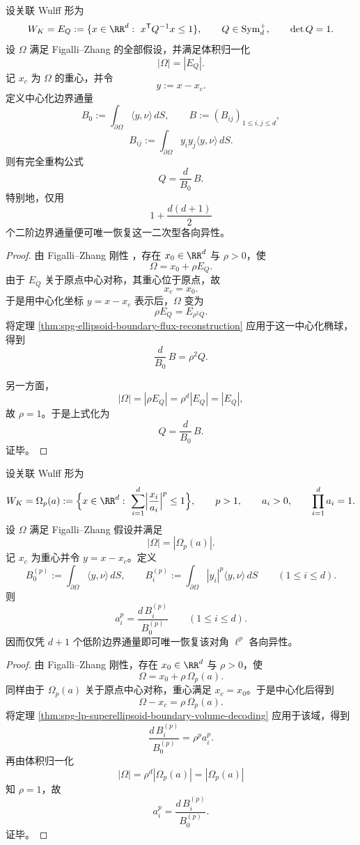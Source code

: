 \begin{theorem}\label{thm:conclusion-serrin-ellipsoid-flux-identifiability}
设关联 Wulff 形为
\[
W_K=E_Q:=\{x\in\RR^d:\ x^{\mathsf T}Q^{-1}x\le 1\},
\qquad
Q\in\mathrm{Sym}_d^+,
\qquad
\det Q=1.
\]
设 \(\Omega\) 满足 Figalli--Zhang 的全部假设，并满足体积归一化
\[
|\Omega|=|E_Q|.
\]
记 \(x_c\) 为 \(\Omega\) 的重心，并令
\[
y:=x-x_c.
\]
定义中心化边界通量
\[
B_0:=\int_{\partial\Omega}\langle y,\nu\rangle\,dS,
\qquad
B:=(B_{ij})_{1\le i,j\le d},
\]
\[
B_{ij}:=\int_{\partial\Omega}y_i y_j\langle y,\nu\rangle\,dS.
\]
则有完全重构公式
\[
Q=\frac{d}{B_0}\,B.
\]
特别地，仅用
\[
1+\frac{d(d+1)}2
\]
个二阶边界通量便可唯一恢复这一二次型各向异性。
\end{theorem}
\begin{proof}
由 Figalli--Zhang 刚性 \cite{FigalliZhang2026AnisotropicSerrinGeneralDomains}，存在 \(x_0\in\RR^d\) 与 \(\rho>0\)，使
\[
\Omega=x_0+\rho E_Q.
\]
由于 \(E_Q\) 关于原点中心对称，其重心位于原点，故
\[
x_c=x_0.
\]
于是用中心化坐标 \(y=x-x_c\) 表示后，\(\Omega\) 变为
\[
\rho E_Q=E_{\rho^2 Q}.
\]
将定理 \ref{thm:spg-ellipsoid-boundary-flux-reconstruction} 应用于这一中心化椭球，得到
\[
\frac{d}{B_0}\,B=\rho^2 Q.
\]

另一方面，
\[
|\Omega|=|\rho E_Q|=\rho^d|E_Q|=|E_Q|,
\]
故 \(\rho=1\)。于是上式化为
\[
Q=\frac{d}{B_0}\,B.
\]
证毕。
\end{proof}

\begin{corollary}\label{cor:conclusion-serrin-lp-wulff-loworder-flux-identifiability}
设关联 Wulff 形为
\[
W_K=\Omega_p(a):=\Bigl\{x\in\RR^d:\ \sum_{i=1}^d\Bigl|\frac{x_i}{a_i}\Bigr|^p\le 1\Bigr\},
\qquad
p>1,
\qquad
a_i>0,
\qquad
\prod_{i=1}^d a_i=1.
\]
设 \(\Omega\) 满足 Figalli--Zhang 假设并满足
\[
|\Omega|=|\Omega_p(a)|.
\]
记 \(x_c\) 为重心并令 \(y=x-x_c\)。定义
\[
B_0^{(p)}:=\int_{\partial\Omega}\langle y,\nu\rangle\,dS,
\qquad
B_i^{(p)}:=\int_{\partial\Omega}|y_i|^p\langle y,\nu\rangle\,dS
\qquad (1\le i\le d).
\]
则
\[
a_i^p=\frac{d\,B_i^{(p)}}{B_0^{(p)}}
\qquad (1\le i\le d).
\]
因而仅凭 \(d+1\) 个低阶边界通量即可唯一恢复该对角 \(\ell^p\) 各向异性。
\end{corollary}
\begin{proof}
由 Figalli--Zhang 刚性，存在 \(x_0\in\RR^d\) 与 \(\rho>0\)，使
\[
\Omega=x_0+\rho\,\Omega_p(a).
\]
同样由于 \(\Omega_p(a)\) 关于原点中心对称，重心满足 \(x_c=x_0\)。于是中心化后得到
\[
\Omega-x_c=\rho\,\Omega_p(a).
\]
将定理 \ref{thm:spg-lp-superellipsoid-boundary-volume-decoding} 应用于该域，得到
\[
\frac{d\,B_i^{(p)}}{B_0^{(p)}}=\rho^p a_i^p.
\]
再由体积归一化
\[
|\Omega|=\rho^d|\Omega_p(a)|=|\Omega_p(a)|
\]
知 \(\rho=1\)，故
\[
a_i^p=\frac{d\,B_i^{(p)}}{B_0^{(p)}}.
\]
证毕。
\end{proof}

